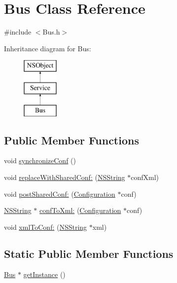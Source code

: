 \hypertarget{interface_bus}{
\section{\-Bus \-Class \-Reference}
\label{interface_bus}
}


{\ttfamily \#include $<$\-Bus.\-h$>$}

\-Inheritance diagram for \-Bus\-:\begin{figure}[H]
\begin{center}
\leavevmode
\includegraphics[height=3.000000cm]{interface_bus}
\end{center}
\end{figure}
\subsection*{\-Public \-Member \-Functions}
\begin{DoxyCompactItemize}
\item 
void \hyperlink{interface_bus_a2d05e4d7022dfc1c451e91cf5a8853ed}{synchronize\-Conf} ()
\item 
void \hyperlink{interface_bus_a4e17c6b0a85578165ff2501fd0df8414}{replace\-With\-Shared\-Conf\-:} (\hyperlink{class_n_s_string}{\-N\-S\-String} $\ast$conf\-Xml)
\item 
void \hyperlink{interface_bus_a01836e96c51b2e55e9a13b9be33f23a6}{post\-Shared\-Conf\-:} (\hyperlink{interface_configuration}{\-Configuration} $\ast$conf)
\item 
\hyperlink{class_n_s_string}{\-N\-S\-String} $\ast$ \hyperlink{interface_bus_a81b470da7a3d41a40778e12d25368457}{conf\-To\-Xml\-:} (\hyperlink{interface_configuration}{\-Configuration} $\ast$conf)
\item 
void \hyperlink{interface_bus_ae53fc8898a64e84bee2c1502633443e2}{xml\-To\-Conf\-:} (\hyperlink{class_n_s_string}{\-N\-S\-String} $\ast$xml)
\end{DoxyCompactItemize}
\subsection*{\-Static \-Public \-Member \-Functions}
\begin{DoxyCompactItemize}
\item 
\hyperlink{interface_bus}{\-Bus} $\ast$ \hyperlink{interface_bus_a0cc500e1b89b361e1b3b37f679071ac3}{get\-Instance} ()
\end{DoxyCompactItemize}


